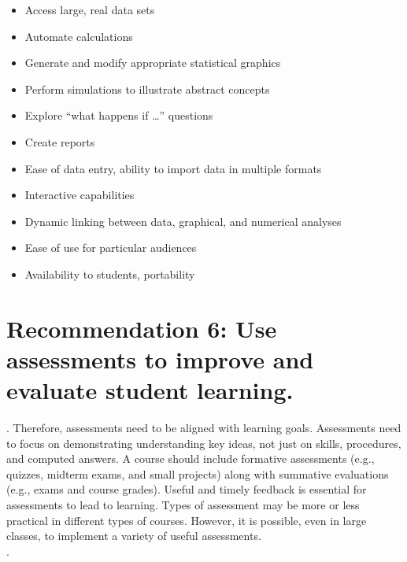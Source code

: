  \vspace{.2in}
\noindent{}
\renewcommand\labelitemi{$\checkmark$}

\begin{itemize}[leftmargin=1cm, itemsep=.2em]
\item Access large, real data sets
\item Automate calculations
\item Generate and modify appropriate statistical graphics
\item Perform simulations to illustrate abstract concepts
\item Explore ``what happens if \ldots'' questions
\item Create reports
\end{itemize}

\vspace{.2in}
 
\noindent{}

\renewcommand\labelitemi{$\filledsquare$}

\begin{itemize}[leftmargin=1cm, itemsep=.2em]
\item Ease of data entry, ability to import data in multiple formats
\item Interactive capabilities
\item Dynamic linking between data, graphical, and numerical analyses 
\item Ease of use for particular audiences
\item Availability to students, portability\\
\end{itemize}


\section{\textbf{Recommendation 6: Use assessments to improve and evaluate student learning.}}

.
Therefore, assessments need to be aligned with learning goals.
Assessments need to focus on demonstrating understanding key ideas, not just on skills, procedures, and computed answers. A course should include formative assessments (e.g., quizzes, midterm exams, and small projects) along with summative evaluations (e.g., exams and course grades). Useful and timely feedback is essential for assessments to lead to learning.  Types of assessment may be more or less practical in different types of courses.
However, it is possible, even in large classes, to implement a variety of useful assessments. \\
.

